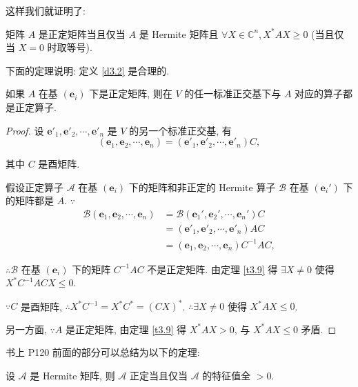 \documentclass{ctexart}
\begin{document}
这样我们就证明了:
\begin{theorem}\label{t3.9}
    矩阵 $A$ 是正定矩阵当且仅当 $A$ 是 Hermite 矩阵且 $\forall X\in\mathbb{C}^n,X^*AX\geq0$ (当且仅当 $X=0$ 时取等号).
\end{theorem}
下面的定理说明: 定义 \ref{d3.2} 是合理的.
\begin{theorem}\label{t3.10}
    如果 $A$ 在基 $(\boldsymbol{e}_i)$ 下是正定矩阵, 则在 $V$ 的任一标准正交基下与 $A$ 对应的算子都是正定算子.
\end{theorem}
\begin{proof}
    设 $\boldsymbol{e}'_1,\boldsymbol{e}'_2,\cdots,\boldsymbol{e}'_n$ 是 $V$ 的另一个标准正交基, 有
    \[(\boldsymbol{e}_1,\boldsymbol{e}_2,\cdots,\boldsymbol{e}_n)=(\boldsymbol{e}'_1,\boldsymbol{e}'_2,\cdots,\boldsymbol{e}'_n)C,\]

    其中 $C$ 是酉矩阵.

    假设正定算子 $\mathcal{A}$ 在基 $(\boldsymbol{e}_i)$ 下的矩阵和非正定的 Hermite 算子 $\mathcal{B}$ 在基 $(\boldsymbol{e}_i')$ 下的矩阵都是 $A$. $\because$
    \begin{align*}
        \mathcal{B}(\boldsymbol{e}_1,\boldsymbol{e}_2,\cdots,\boldsymbol{e}_n) & =\mathcal{B}(\boldsymbol{e}_1',\boldsymbol{e}_2',\cdots,\boldsymbol{e}_n')C \\
        & =(\boldsymbol{e}'_1,\boldsymbol{e}'_2,\cdots,\boldsymbol{e}'_n)AC \\
        & =(\boldsymbol{e}_1,\boldsymbol{e}_2,\cdots,\boldsymbol{e}_n)C^{-1}AC,
    \end{align*}

    $\therefore\mathcal{B}$ 在基 $(\boldsymbol{e}_i)$ 下的矩阵 $C^{-1}AC$ 不是正定矩阵. 由定理 \ref{t3.9} 得 $\exists X\neq0$ 使得 $X^*C^{-1}ACX\leq0$.

    $\because C$ 是酉矩阵, $\therefore X^*C^{-1}=X^*C^*=(CX)^*$. $\therefore\exists X\neq0$ 使得 $X^*AX\leq0$.

    另一方面, $\because A$ 是正定矩阵, 由定理 \ref{t3.9} 得 $X^*AX>0$, 与 $X^*AX\leq0$ 矛盾.
\end{proof}
书上 P120 前面的部分可以总结为以下的定理:
\begin{theorem}\label{t3.11}
    设 $\mathcal{A}$ 是 Hermite 矩阵, 则 $\mathcal{A}$ 正定当且仅当 $\mathcal{A}$ 的特征值全 $>0$.
\end{theorem}
\end{document}
